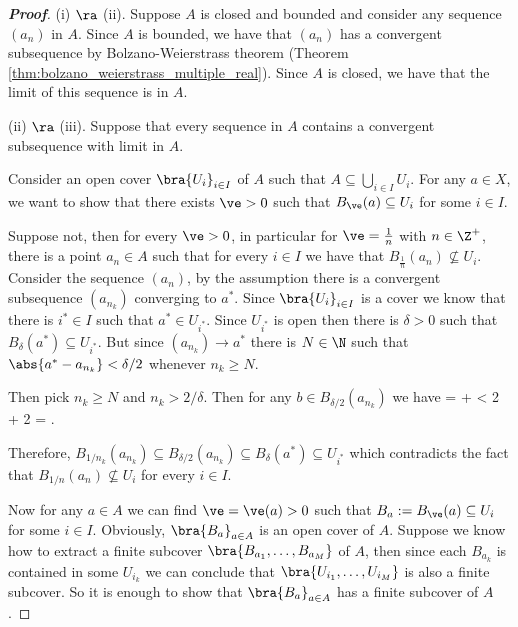 \begin{proof}[\bf Proof]
\ben
\item [(i)] $\ra$ (ii). Suppose $A$ is closed and bounded and consider any sequence $(a_n)$ in $A$. Since $A$ is bounded, we have that $(a_n)$ has a convergent subsequence by Bolzano-Weierstrass theorem (Theorem \ref{thm:bolzano_weierstrass_multiple_real}). Since $A$ is closed, we have that the limit of this sequence is in $A$.

\item [(ii)] $\ra$ (iii). Suppose that every sequence in $A$ contains a convergent subsequence with limit in $A$.

Consider an open cover $\bra{U_i}_{i\in I}$ of $A$ such that $A \subseteq \bigcup_{i\in I} U_i$. For any $a\in X$, we want to show that there exists $\ve>0$ such that $B_\ve(a) \subseteq U_i$ for some $i\in I$.

Suppose not, then for every $\ve>0$, in particular for $\ve = \frac 1n$ with $n\in \Z^+$, there is a point $a_n\in A$ such that for every $i\in I$ we have that $B_{\frac 1n}(a_n) \not\subseteq U_i$. Consider the sequence $(a_n)$, by the assumption there is a convergent subsequence $(a_{n_k})$ converging to $a^*$. Since $\bra{U_i}_{i \in I}$ is a cover we know that there is $i^* \in I$ such that $a^* \in U_{i^*}$. Since $U_{i^*}$ is open then there is $\delta >0$ such that $B_{\delta}(a^*) \subseteq U_{i^*}$. But since $(a_{n_k})\to a^*$ there is $N\in \N$ such that $\abs{a^* - a_{n_k}} < \delta/2$ whenever $n_k\geq N$.

Then pick $n_k\geq N$ and $n_k > 2/\delta$. Then for any $b\in B_{\delta/2}(a_{n_k})$ we have
\be
{} =  \leq {} +  < \frac {\delta}2 + \frac{\delta}2 = \delta.
\ee

Therefore, $B_{1/n_k}(a_{n_k}) \subseteq B_{\delta/2} (a_{n_k}) \subseteq B_\delta(a^*) \subseteq U_{i^*}$ which contradicts the fact that $B_{1/n}(a_n) \not\subseteq U_i$ for every $i \in I$.


Now for any $a\in A$ we can find $\ve= \ve(a)>0$ such that $B_a := B_\ve(a) \subseteq U_{i}$ for some $i\in I$. Obviously, $\bra{B_a}_{a\in A}$ is an open cover of $A$. Suppose we know how to extract a finite subcover $\bra{B_{a_1},\dots,B_{a_M}}$ of $A$, then since each $B_{a_k}$ is contained in some $U_{i_k}$ we can conclude that $\bra{U_{i_1},\dots,U_{i_M}}$ is also a finite subcover. So it is enough to show that $\bra{B_{a}}_{a\in A}$ has a finite subcover of $A$.


\end{proof}

